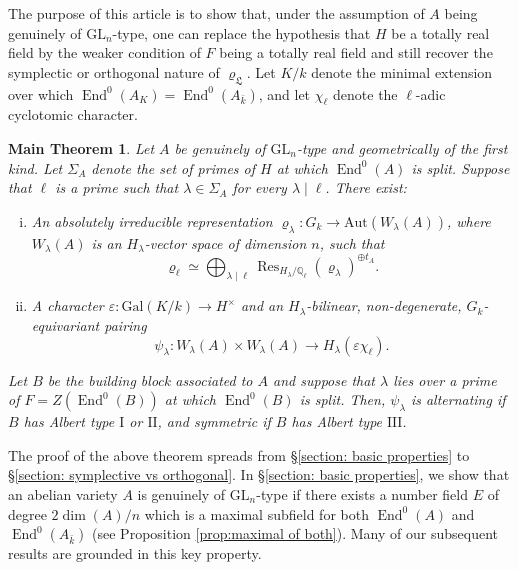 \documentclass[oneside]{amsart}
\newtheorem*{theorem*}{Main Theorem}
\theoremstyle{remark}
\newcommand{\kbar}{{\bar{k}}}
\newcommand{\Gal}{\mathrm{Gal}}
\newcommand{\GL}{\mathrm{GL}}
\newcommand{\Aut}{\mathrm{Aut}}
\newcommand{\End}{\operatorname{End}}
\newcommand{\Res}{\operatorname{Res}}
\newcommand{\I}{\mathrm{I}}
\newcommand{\II}{\mathrm{II}}
\newcommand{\III}{\mathrm{III}}
\newcommand{\Ll}{\mathfrak{L}}
\numberwithin{equation}{section}
\newcommand{\QQ}{\mathbb{Q}}
\begin{document}
The purpose of this article is to show that, under the assumption of $A$ being genuinely of $\GL_n$-type, one can replace the hypothesis that $H$ be a totally real field by the weaker condition of $F$ being a totally real field and still recover the symplectic or orthogonal nature of $\varrho_\Ll$. Let $K/k$ denote the minimal extension over which $\End^0(A_K)=\End^0(A_\kbar)$, and let $\chi_\ell$ denote the $\ell$-adic cyclotomic character.

\label{thm:main}
\begin{theorem*}
Let $A$ be genuinely of $\GL_n$-type and geometrically of the first kind. Let $\Sigma_A$ denote the set of primes of $H$ at which $\End^0(A)$ is split. Suppose that $\ell$ is a prime such that $\lambda \in \Sigma_A$ for every $\lambda\mid \ell$. There exist:
\begin{enumerate}[i)]
\item An absolutely irreducible representation $\varrho_\lambda :G_k\rightarrow \Aut(W_\lambda(A))$, where $W_\lambda(A)$ is an $H_{\lambda}$-vector space of dimension $n$, such that 
\begin{equation}\label{equation: rholrholambda}
\varrho_\ell\simeq \bigoplus_{\lambda\mid \ell }\Res_{H_\lambda/\QQ_\ell}(\varrho_\lambda)^{\oplus t_A}.
\end{equation}
\item A character $\varepsilon: \Gal(K/k)\rightarrow H^\times$ and an $H_\lambda$-bilinear, non-degenerate, $G_k$-equivariant pairing
	\[
		\psi_\lambda:W_\lambda (A)\times W_\lambda (A) \to H_\lambda(\varepsilon \chi_\ell).
              \]
            
            \end{enumerate}
            Let $B$ be the building block associated to $A$ and suppose that $\lambda$ lies over a prime of $F=Z(\End^0(B))$ at which $\End^0(B)$ is split. Then, $\psi_\lambda$ is alternating if $B$ has Albert type $\I$ or $\II$, and symmetric if $B$ has Albert type $\III$.
\end{theorem*}

The proof of the above theorem spreads from \S\ref{section: basic properties} to \S \ref{section: symplective vs orthogonal}. In \S\ref{section: basic properties}, we show that an abelian variety $A$ is genuinely of $\GL_n$-type if there exists a number field $E$ of degree $2\dim(A)/n$ which is a maximal subfield for both $\End^0(A)$ and $\End^0(A_\kbar)$ (see Proposition \ref{prop:maximal of both}). Many of our subsequent results are grounded in this key property.
\end{document}
